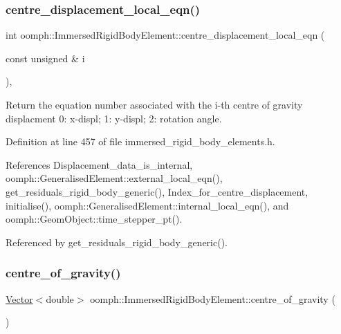 \subsubsection{\texorpdfstring{centre\+\_\+displacement\+\_\+local\+\_\+eqn()}{centre\_displacement\_local\_eqn()}}
{\footnotesize\ttfamily int oomph\+::\+Immersed\+Rigid\+Body\+Element\+::centre\+\_\+displacement\+\_\+local\+\_\+eqn (\begin{DoxyParamCaption}\item[{const unsigned \&}]{i }\end{DoxyParamCaption})\hspace{0.3cm}{\ttfamily [inline]}, {\ttfamily [private]}}



Return the equation number associated with the i-\/th centre of gravity displacment 0\+: x-\/displ; 1\+: y-\/displ; 2\+: rotation angle. 



Definition at line 457 of file immersed\+\_\+rigid\+\_\+body\+\_\+elements.\+h.



References Displacement\+\_\+data\+\_\+is\+\_\+internal, oomph\+::\+Generalised\+Element\+::external\+\_\+local\+\_\+eqn(), get\+\_\+residuals\+\_\+rigid\+\_\+body\+\_\+generic(), Index\+\_\+for\+\_\+centre\+\_\+displacement, initialise(), oomph\+::\+Generalised\+Element\+::internal\+\_\+local\+\_\+eqn(), and oomph\+::\+Geom\+Object\+::time\+\_\+stepper\+\_\+pt().



Referenced by get\+\_\+residuals\+\_\+rigid\+\_\+body\+\_\+generic().

\mbox{\label{classoomph_1_1ImmersedRigidBodyElement_a087cd76b208e47bb4b29a63f01d2b6f7}} 
\subsubsection{\texorpdfstring{centre\+\_\+of\+\_\+gravity()}{centre\_of\_gravity()}}
{\footnotesize\ttfamily \hyperlink{classoomph_1_1Vector}{Vector}$<$double$>$ oomph\+::\+Immersed\+Rigid\+Body\+Element\+::centre\+\_\+of\+\_\+gravity (\begin{DoxyParamCaption}{ }\end{DoxyParamCaption})\hspace{0.3cm}{\ttfamily [inline]}}




